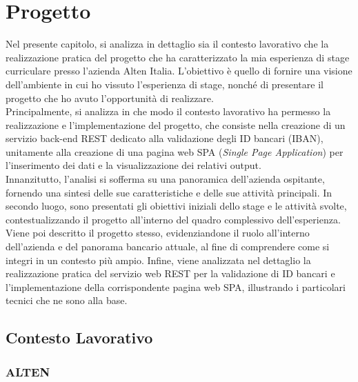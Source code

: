 \chapter{Progetto}
\label{chap:Progetto}

Nel presente capitolo, si analizza in dettaglio sia il contesto lavorativo che la realizzazione pratica del progetto che ha caratterizzato la mia esperienza di stage curriculare presso l'azienda Alten Italia. L’obiettivo è quello di fornire una visione dell’ambiente in cui ho vissuto l'esperienza di stage, nonché di presentare il progetto che ho avuto l'opportunità di realizzare.\\
Principalmente, si analizza in che modo il contesto lavorativo ha permesso la realizzazione e l'implementazione del progetto, che consiste nella creazione di un servizio back-end REST dedicato alla validazione degli ID bancari (IBAN), unitamente alla creazione di una pagina web SPA (\textit{Single Page Application}) per l'inserimento dei dati e la visualizzazione dei relativi output.\\
Innanzitutto, l'analisi si sofferma su una panoramica dell'azienda ospitante, fornendo una sintesi delle sue caratteristiche e delle sue attività principali. In secondo luogo, sono presentati gli obiettivi iniziali dello stage e le attività svolte, contestualizzando il progetto all'interno del quadro complessivo dell'esperienza. Viene poi descritto il progetto stesso, evidenziandone il ruolo all’interno dell’azienda e del panorama bancario attuale, al fine di comprendere come si integri in un contesto più ampio. Infine, viene analizzata nel dettaglio la realizzazione pratica del servizio web REST per la validazione di ID bancari e l’implementazione della corrispondente pagina web SPA, illustrando i particolari tecnici che ne sono alla base.

\clearpage
\section{Contesto Lavorativo}

\subsection{ALTEN}

